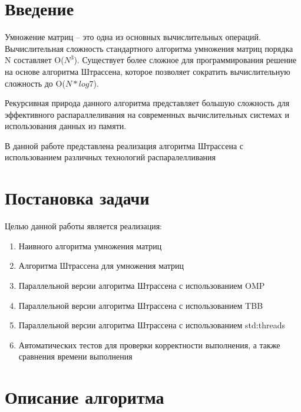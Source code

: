 \documentclass{report}
\begin{document}
\setcounter{page}{2}

\tableofcontents
\newpage

\section*{Введение}
Умножение матриц – это одна из основных вычислительных операций. Вычислительная сложность стандартного алгоритма умножения матриц порядка N составляет O(${N^3}$).
Существует более сложное для программирования решение на основе алгоритма Штрассена, которое позволяет сократить вычислительную сложность до O(${N*log7}$). 
\par Рекурсивная природа данного алгоритма представляет большую сложность для эффективного распараллеливания на современных вычислительных системах и использования данных из памяти.
\par В данной работе представлена реализация алгоритма Штрассена с использованием различных технологий распаралелливания
\newpage

\section*{Постановка задачи}

Целью данной работы является реализация:

\begin{enumerate} 

\item Наивного алгоритма умножения матриц
\item Алгоритма Штрассена для умножения матриц
\item Параллельной версии алгоритма Штрассена с использованием OMP
\item Параллельной версии алгоритма Штрассена с использованием TBB
\item Параллельной версии алгоритма Штрассена с использованием std:threads
\item Автоматических тестов для проверки корректности выполнения, а также сравнения времени выполнения

\end{enumerate} 

\newpage

\section*{Описание алгоритма}
\end{document}

